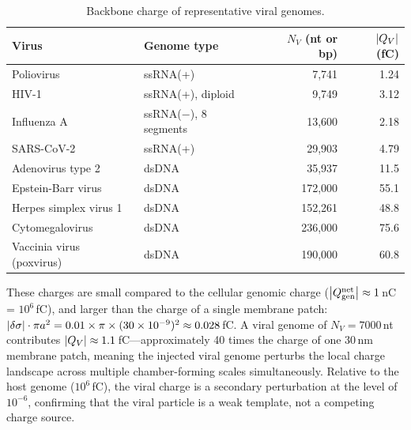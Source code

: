 \begin{table}[h]
\centering
\caption{Backbone charge of representative viral genomes.}
\label{v:tab:viral_charges}
\begin{tabular}{llrr}
\toprule
Virus & Genome type & $N_V$ (nt or bp) & $\abs{Q_V}$ (fC) \\
\midrule
Poliovirus & ssRNA(+) & 7,741 & 1.24 \\
HIV-1 & ssRNA(+), diploid & 9,749 & 3.12 \\
Influenza A & ssRNA($-$), 8 segments & 13,600 & 2.18 \\
SARS-CoV-2 & ssRNA(+) & 29,903 & 4.79 \\
Adenovirus type 2 & dsDNA & 35,937 & 11.5 \\
Epstein-Barr virus & dsDNA & 172,000 & 55.1 \\
Herpes simplex virus 1 & dsDNA & 152,261 & 48.8 \\
Cytomegalovirus & dsDNA & 236,000 & 75.6 \\
Vaccinia virus (poxvirus) & dsDNA & 190,000 & 60.8 \\
\bottomrule
\end{tabular}
\end{table}

These charges are small compared to the cellular genomic charge ($\abs{Q_{\mathrm{gen}}^{\mathrm{net}}} \approx 1$\,nC = $10^6$\,fC), and larger than the charge of a single membrane patch: $\abs{\delta\sigma} \cdot \pi a^2 = 0.01 \times \pi \times (30 \times 10^{-9})^2 \approx 0.028$\,fC. A viral genome of $N_V = 7000$\,nt contributes $\abs{Q_V} \approx 1.1$\,fC---approximately 40 times the charge of one 30\,nm membrane patch, meaning the injected viral genome perturbs the local charge landscape across multiple chamber-forming scales simultaneously. Relative to the host genome ($10^6$\,fC), the viral charge is a secondary perturbation at the level of $10^{-6}$, confirming that the viral particle is a weak template, not a competing charge source.

